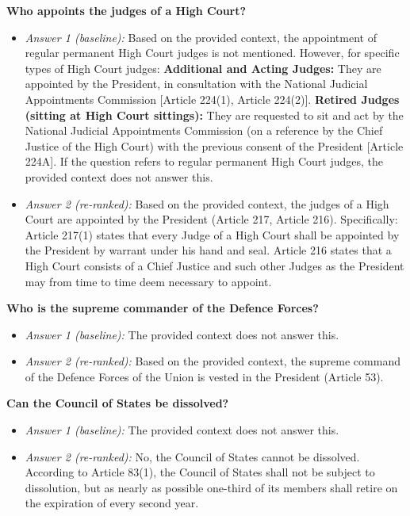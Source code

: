 \documentclass[10pt,a4paper]{article}
\begin{document}
\textbf{Who appoints the judges of a High Court?}
\begin{itemize}[nosep,leftmargin=1.2em]
\item \emph{Answer 1 (baseline):} Based on the provided context, the appointment of regular permanent High Court judges is not mentioned. However, for specific types of High Court judges: \textbullet{} \textbf{Additional and Acting Judges:} They are appointed by the President, in consultation with the National Judicial Appointments Commission [Article 224(1), Article 224(2)]. \textbullet{} \textbf{Retired Judges (sitting at High Court sittings):} They are requested to sit and act by the National Judicial Appointments Commission (on a reference by the Chief Justice of the High Court) with the previous consent of the President [Article 224A]. If the question refers to regular permanent High Court judges, the provided context does not answer this.
\item \emph{Answer 2 (re-ranked):} Based on the provided context, the judges of a High Court are appointed by the President (Article 217, Article 216). Specifically: \textbullet{} Article 217(1) states that every Judge of a High Court shall be appointed by the President by warrant under his hand and seal. \textbullet{} Article 216 states that a High Court consists of a Chief Justice and such other Judges as the President may from time to time deem necessary to appoint.
\end{itemize}
\textbf{Who is the supreme commander of the Defence Forces?}
\begin{itemize}[nosep,leftmargin=1.2em]
\item \emph{Answer 1 (baseline):} The provided context does not answer this.
\item \emph{Answer 2 (re-ranked):} Based on the provided context, the supreme command of the Defence Forces of the Union is vested in the President (Article 53).
\end{itemize}
\textbf{Can the Council of States be dissolved?}
\begin{itemize}[nosep,leftmargin=1.2em]
\item \emph{Answer 1 (baseline):} The provided context does not answer this.
\item \emph{Answer 2 (re-ranked):} No, the Council of States cannot be dissolved. According to Article 83(1), the Council of States shall not be subject to dissolution, but as nearly as possible one-third of its members shall retire on the expiration of every second year.
\end{itemize}
\end{document}
